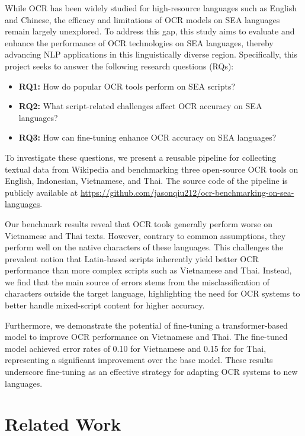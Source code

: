\documentclass[12pt,oneside]{memoir}
\begin{document}
While OCR has been widely studied for high-resource languages such as English and Chinese, the efficacy and limitations of OCR models on SEA languages remain largely unexplored.
To address this gap, this study aims to evaluate and enhance the performance of OCR technologies on SEA languages, thereby advancing NLP applications in this linguistically diverse region.
Specifically, this project seeks to answer the following research questions (RQs):

\begin{itemize}
    \item \textbf{RQ1:} How do popular OCR tools perform on SEA scripts?
    \item \textbf{RQ2:} What script-related challenges affect OCR accuracy on SEA languages?
    \item \textbf{RQ3:} How can fine-tuning enhance OCR accuracy on SEA languages?
\end{itemize}

To investigate these questions, we present a reusable pipeline for collecting textual data from Wikipedia and benchmarking three open-source OCR tools on English, Indonesian, Vietnamese, and Thai.
The source code of the pipeline is publicly available at \url{https://github.com/jasonqiu212/ocr-benchmarking-on-sea-languages}.

Our benchmark results reveal that OCR tools generally perform worse on Vietnamese and Thai texts.
However, contrary to common assumptions, they perform well on the native characters of these languages. 
This challenges the prevalent notion that Latin-based scripts inherently yield better OCR performance than more complex scripts such as Vietnamese and Thai.
Instead, we find that the main source of errors stems from the misclassification of characters outside the target language, highlighting the need for OCR systems to better handle mixed-script content for higher accuracy.

Furthermore, we demonstrate the potential of fine-tuning a transformer-based model to improve OCR performance on Vietnamese and Thai. 
The fine-tuned model achieved error rates of 0.10 for Vietnamese and 0.15 for for Thai, representing a significant improvement over the base model.
These results underscore fine-tuning as an effective strategy for adapting OCR systems to new languages.

\chapter{Related Work}
\end{document}
